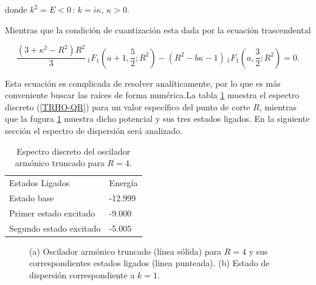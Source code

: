 donde $k^2 = E < 0 \,:\, k = i \kappa,\, \kappa > 0 $.

Mientras que la condición de cuantización esta dada por la ecuación trascendental

\begin{equation*}
\frac{(3+\kappa^{2}-R^{2})R^{2}}{3}\, _1F_1\left(a+1,\frac{5}{2};R^{2}\right)-\left(R^{2}-b\kappa-1\right)\, _1F_1 \left(a,\frac{3}{2};R^{2}\right)=0.\label{TRHO-QR}
\end{equation*}

Esta ecuación es complicada de resolver analíticamente, por lo que es más conveniente buscar las raíces de forma numérica.La tabla \ref{TRHO-Table} muestra el espectro discreto (\ref{TRHO-QR}) para un valor específico del punto de corte $R$, mientras que la fugura \ref{TRHO-Figure} muestra dicho potencial y sus tres estados ligados. En la siguiente sección el espectro de dispersión será analizado.

\begin{table}
	\caption{\label{TRHO-Table} Espectro discreto del oscilador armónico truncado para $R=4$.}
	\begin{center}
		\begin{tabular}{ll}
			Estados Ligados & Energía\\
			
			Estado base & -12.999\\
			
			Primer estado excitado & -9.000\\
			
			Segundo estado excitado & -5.005\\
			
		\end{tabular}
	\end{center}
\end{table}

\begin{figure}
	\centering
	\hfill%
	\caption{\label{TRHO-Figure} (a) Oscilador armónico truncado (línea sólida) para $R=4$ y sus correspondientes estados ligados (linea punteada). (b) Estado de dispersión correspondiente a $k=1$.}
\end{figure}


